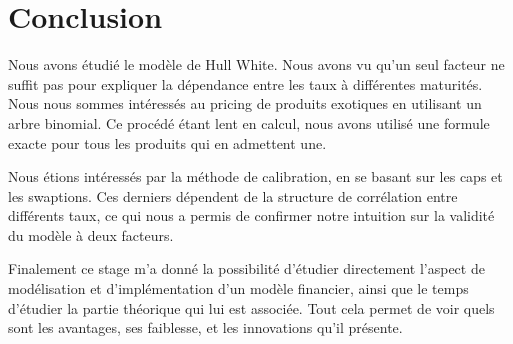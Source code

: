 \chapter*{Conclusion}
Nous avons étudié le modèle de Hull White. Nous avons vu qu'un seul facteur ne suffit pas pour expliquer la dépendance entre les taux à différentes maturités. Nous nous sommes intéressés au pricing de produits exotiques en utilisant un arbre binomial. Ce procédé étant lent en calcul, nous avons utilisé une formule exacte pour tous les produits qui en admettent une.

Nous étions intéressés par la méthode de calibration, en se basant sur les caps et les swaptions. Ces derniers dépendent de la structure de corrélation entre différents taux, ce qui nous a permis de confirmer notre intuition sur la validité du modèle à deux facteurs.

Finalement ce stage m'a donné la possibilité d'étudier directement l'aspect de modélisation et d'implémentation d'un modèle financier, ainsi que le temps d'étudier la partie théorique qui lui est associée. Tout cela permet de voir quels sont les avantages, ses faiblesse,  et les innovations qu'il présente.

